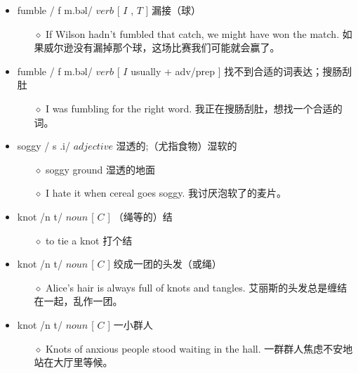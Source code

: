 \documentclass[a4paper,top=2.5cm,buttom=2.5cm10.5pt]{book}
\begin{document}
\begin{itemize}
\item fumble / \textprimstress f \textturnv m.bəl/ $ verb $ [  $ I $ , $ T $  ] 漏接（球）
\begin{itemize}
\item[$\diamond$] If Wilson hadn't fumbled that catch, we might have won the match.
如果威尔逊没有漏掉那个球，这场比赛我们可能就会赢了。
\end{itemize}
\end{itemize}
\begin{itemize}
\item fumble / \textprimstress f \textturnv m.bəl/ $ verb $ [  $ I $  usually + adv/prep ] 找不到合适的词表达；搜肠刮肚
\begin{itemize}
\item[$\diamond$] I was fumbling for the right word.
我正在搜肠刮肚，想找一个合适的词。
\end{itemize}
\end{itemize}
\begin{itemize}
\item soggy / \textprimstress s \textturnscripta  \textscriptg .i/ $ adjective $  湿透的;（尤指食物）湿软的
\begin{itemize}
\item[$\diamond$] soggy ground
湿透的地面
\item[$\diamond$] I hate it when cereal goes soggy.
我讨厌泡软了的麦片。
\end{itemize}
\end{itemize}
\begin{itemize}
\item knot /n \textturnscripta t/ $ noun $ [  $ C $  ] （绳等的）结
\begin{itemize}
\item[$\diamond$] to tie a knot
打个结
\end{itemize}
\end{itemize}
\begin{itemize}
\item knot /n \textturnscripta t/ $ noun $ [  $ C $  ] 绞成一团的头发（或绳）
\begin{itemize}
\item[$\diamond$] Alice's hair is always full of knots and tangles.
艾丽斯的头发总是缠结在一起，乱作一团。
\end{itemize}
\end{itemize}
\begin{itemize}
\item knot /n \textturnscripta t/ $ noun $ [  $ C $  ] 一小群人
\begin{itemize}
\item[$\diamond$] Knots of anxious people stood waiting in the hall.
一群群人焦虑不安地站在大厅里等候。
\end{itemize}
\end{itemize}
\end{document}

